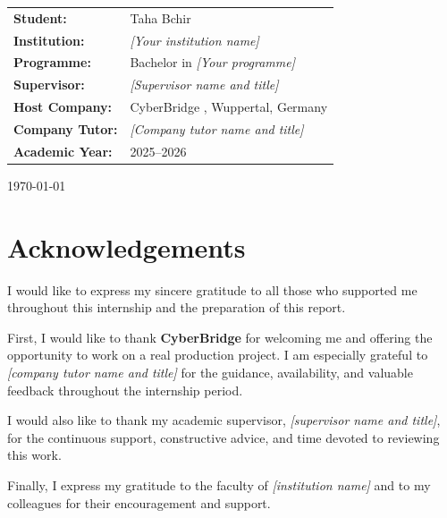 \documentclass[12pt,a4paper]{report}
\begin{document}
{\begin{titlepage}
    \begin{flushleft}
      \renewcommand{\arraystretch}{1.3}
      \begin{tabular}{l l}
        \textbf{Student:}       & Taha Bchir \\
        \textbf{Institution:}   & \emph{[Your institution name]} \\
        \textbf{Programme:}     & Bachelor in \emph{[Your programme]} \\
        \textbf{Supervisor:}    & \emph{[Supervisor name and title]} \\
        \textbf{Host Company:}  & CyberBridge , Wuppertal, Germany \\
        \textbf{Company Tutor:} & \emph{[Company tutor name and title]} \\
        \textbf{Academic Year:} & 2025--2026 \\
      \end{tabular}
    \end{flushleft}

    \vfill
    {\large \today\par}
  \end{titlepage}
}

\setcounter{page}{1}


\chapter*{Acknowledgements}
{}

I would like to express my sincere gratitude to all those who supported me throughout
this internship and the preparation of this report.

First, I would like to thank \textbf{CyberBridge} for welcoming me and offering the
opportunity to work on a real production project.
I am especially grateful to \emph{[company tutor name and title]} for the guidance,
availability, and valuable feedback throughout the internship period.

I would also like to thank my academic supervisor, \emph{[supervisor name and title]},
for the continuous support, constructive advice, and time devoted to reviewing this work.

Finally, I express my gratitude to the faculty of \emph{[institution name]} and to my
colleagues for their encouragement and support.
\end{document}
